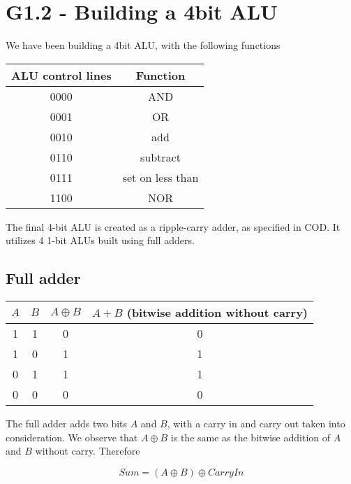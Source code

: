 \documentclass[11pt,a4paper]{article}
\begin{document}

\section*{G1.2 - Building a 4bit ALU}
We have been building a 4bit ALU, with the following functions

\begin{table}[htb!]
\begin{tabular}{| c | c |}
    \centering
    ALU control lines & Function \\ \hline
    0000 & AND \\
    0001 & OR \\
    0010 & add \\
    0110 & subtract \\
    0111 & set on less than \\
    1100 & NOR \\

\end{tabular}
\end{table}

The final 4-bit ALU is created as a ripple-carry adder, as specified in COD\@.
It utilizes 4 1-bit ALUs built using full adders.

\subsection*{Full adder} %
\label{sub:Full_adder}

\begin{table}[htb!]
    \centering
    \begin{tabular}{c | c || c || c}
        $A$ & $B$ & $A \oplus B$ & $A + B$ (bitwise addition without carry) \\ \hline
        1 & 1 & 0                & 0        \\
        1 & 0 & 1                & 1        \\
        0 & 1 & 1                & 1        \\
        0 & 0 & 0                & 0        \\
    \end{tabular}
\end{table}

The full adder adds two bits $A$ and $B$, with a carry in and carry out taken into
consideration. We observe that $A \oplus B$ is the same as the bitwise addition
of $A$ and $B$ without carry. Therefore

\begin{equation*}
    Sum = (A \oplus B) \oplus CarryIn
\end{equation*}
\end{document}

